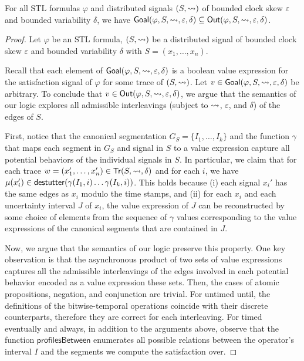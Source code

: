 \begin{theorem}
	

	For all STL formulas $\varphi$ and distributed signals $(S, {\rightsquigarrow})$ of bounded clock skew $\varepsilon$ and bounded variability $\delta$, we have $\mathsf{Goal}(\varphi, S, {\rightsquigarrow}, \varepsilon, \delta) \subseteq \mathsf{Out}(\varphi, S, {\rightsquigarrow}, \varepsilon, \delta)$.
\end{theorem}
\begin{proof}
	Let $\varphi$ be an STL formula, $(S, {\rightsquigarrow})$ be a distributed signal of bounded clock skew $\varepsilon$ and bounded variability $\delta$ with $S = (x_1, \ldots, x_n)$.
	
	Recall that each element of $\mathsf{Goal}(\varphi, S, {\rightsquigarrow}, \varepsilon, \delta)$ is a boolean value expression for the satisfaction signal of $\varphi$ for some trace of $(S,{\rightsquigarrow})$.
	Let $v \in \mathsf{Goal}(\varphi, S, {\rightsquigarrow}, \varepsilon, \delta)$ be arbitrary.
	To conclude that $v \in \mathsf{Out}(\varphi, S, {\rightsquigarrow}, \varepsilon, \delta)$, we argue that the semantics of our logic explores all admissible interleavings (subject to ${\rightsquigarrow}$, $\varepsilon$, and $\delta$) of the edges of $S$.
	
	First, notice that the canonical segmentation $G_S = \{ I_1, \ldots, I_k \}$ and the function $\gamma$ that maps each segment in $G_S$ and signal in $S$ to a value expression capture all potential behaviors of the individual signals in $S$.
	In particular, we claim that for each trace $w = (x_1', \ldots, x_n') \in \mathsf{Tr}(S, {\rightsquigarrow}, \delta)$ and for each $i$, we have $\mu(x_i') \in \mathsf{destutter}(\gamma(I_1, i) \ldots \gamma(I_k, i))$.
	This holds because (i) each signal $x_i'$ has the same edges as $x_i$ modulo the time stamps, and (ii) for each $x_i$ and each uncertainty interval $J$ of $x_i$, the value expression of $J$ can be reconstructed by some choice of elements from the sequence of $\gamma$ values corresponding to the value expressions of the canonical segments that are contained in $J$.
	
	Now, we argue that the semantics of our logic preserve this property.
	One key observation is that the asynchronous product of two sets of value expressions captures all the admissible interleavings of the edges involved in each potential behavior encoded as a value expression these sets.
	Then, the cases of atomic propositions, negation, and conjunction are trivial.
	For untimed until, the definitions of the bitwise-temporal operations coincide with their discrete counterparts, therefore they are correct for each interleaving.
	For timed eventually and always, in addition to the arguments above, observe that the function $\mathsf{profilesBetween}$ enumerates all possible relations between the operator's interval $I$ and the segments we compute the satisfaction over.
	

\end{proof}
